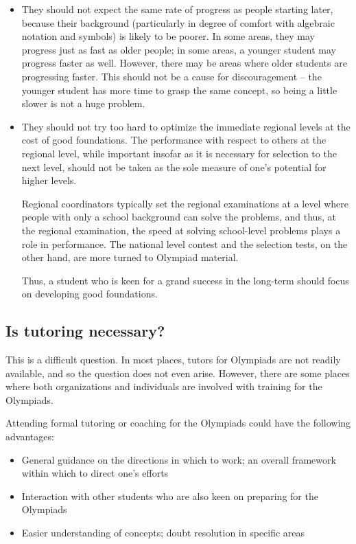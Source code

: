 \documentclass[a4paper]{amsart}
\begin{document}
\begin{itemize}

\item They should not expect the same rate of progress as people
  starting later, because their background (particularly in degree of
  comfort with algebraic notation and symbols) is likely to be poorer.
  In some areas, they may progress just as fast as older people; in
  some areas, a younger student may progress faster as well. However,
  there may be areas where older students are progressing faster.
  This should not be a cause for discouragement -- the younger student
  has more time to grasp the same concept, so being a little slower is
  not a huge problem.

\item They should not try too hard to optimize the immediate regional
  levels at the cost of good foundations. The performance with respect
  to others at the regional level, while important insofar as it is
  necessary for selection to the next level, should not be taken
  as the sole measure of one's potential for higher levels.

  Regional coordinators typically set the regional examinations at a
  level where people with only a school background can solve the
  problems, and thus, at the regional examination, the speed at
  solving school-level problems plays a role in performance. The
  national level contest and the selection tests, on the other hand,
  are more turned to Olympiad material.

  Thus, a student who is keen for a grand success in the long-term should
  focus on developing good foundations.

\end{itemize}

\subsection{Is tutoring necessary?}

This is a difficult question. In most places, tutors for Olympiads are not
readily available, and so the question does not even arise. However,
there are some places where both organizations and individuals
are involved with training for the Olympiads.

Attending formal tutoring or coaching for the Olympiads could have the
following advantages:

\begin{itemize}

\item General guidance on the directions in which to work; an overall
  framework within which to direct one's efforts

\item Interaction with other students who are also keen on preparing
  for the Olympiads

\item Easier understanding of concepts; doubt resolution
  in specific areas

\end{itemize}
\end{document}
